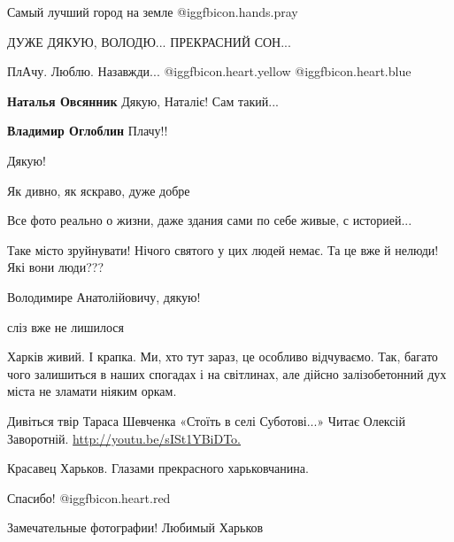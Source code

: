  
 
 
 
 
\zzSecCmt

\begin{itemize} %
Самый лучший город на земле  @igg{fbicon.hands.pray} 

ДУЖЕ ДЯКУЮ, ВОЛОДЮ... ПРЕКРАСНИЙ СОН...

ПлАчу. Люблю. Назавжди... @igg{fbicon.heart.yellow}  @igg{fbicon.heart.blue} 

\textbf{Наталья Овсянник} Дякую, Наталіє! Сам такий...

\textbf{Владимир Оглоблин} Плачу!!

Дякую!

Як дивно, як яскраво, дуже добре

Все фото реально о жизни, даже здания сами по себе живые, с историей...

Таке місто зруйнувати! Нічого святого у цих людей немає. Та це вже й нелюди! Які вони люди???

Володимире Анатолійовичу, дякую!

сліз вже не лишилося


Харків живий. І крапка. Ми, хто тут зараз, це особливо відчуваємо. Так, багато
чого залишиться в наших спогадах і на світлинах, але дійсно залізобетонний дух
міста не зламати ніяким оркам.


Дивіться твір Тараса Шевченка «Стоїть в селі Суботові...» Читає Олексій
Заворотній. \url{http://youtu.be/sISt1YBiDTo.}

Красавец Харьков. Глазами прекрасного харьковчанина.

Спасибо! @igg{fbicon.heart.red}

Замечательные фотографии! Любимый Харьков


\end{itemize}
